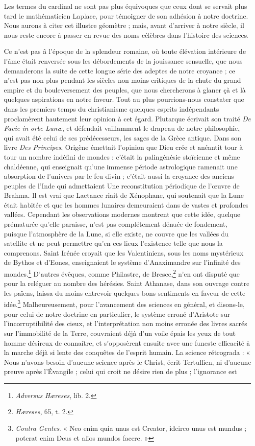 \documentclass[a4paper, 11pt, oneside]{article}
\begin{document}
Les termes du cardinal ne sont pas plus équivoques que ceux dont se servait plus tard le mathématicien Laplace, pour témoigner de son adhésion à notre doctrine. Nous aurons à citer cet illustre géomètre ; mais, avant d'arriver à notre siècle, il nous reste encore à passer en revue des noms célèbres dans l'histoire des sciences.

Ce n'est pas â l'époque de la splendeur romaine, où toute élévation intérieure de l'âme était renversée sous les débordements de la jouissance sensuelle, que nous demanderons la suite de cette longue série des adeptes de notre croyance ; ce n'est pas non plus pendant les siècles non moins critiques de la chute du grand empire et du bouleversement des peuples, que nous chercherons à glaner çà et là quelques aspirations en notre faveur. Tout au plus pourrions-nous constater que dans les premiers temps du christianisme quelques esprits indépendants proclamèrent hautement leur opinion à cet égard. Plutarque écrivait son traité \emph{De Facie in orbe Lunæ}, et défendait vaillamment le drapeau de notre philosophie, qui avait été celui de ses prédécesseurs, les sages de la Grèce antique. Dans son livre \emph{Des Principes}, Origène émettait l'opinion que Dieu crée et anéantit tour à tour un nombre indéfini de mondes : c'était la palingénésie stoïcienne et même chaldéenne, qui enseignait qu'une immense période astrologique ramenait une absorption de l'univers par le feu divin ; c'était aussi la croyance des anciens peuples de l'Inde qui admettaient Une reconstitution périodique de l'œuvre de Brahma. Il est vrai que Lactance riait de Xénophane, qui soutenait que la Lune était habitée et que les hommes lunaires demeuraient dans de vastes et profondes vallées. Cependant les observations modernes montrent que cette idée, quelque prématurée qu'elle paraisse, n'est pas complétement dénuée de fondement, puisque l'atmosphère de la Lune, si elle existe, ne couvre que les vallées du satellite et ne peut permettre qu'en ces lieux l'existence telle que nous la comprenons. Saint Irénée croyait que les Valentiniens, sous les noms mystérieux de Bythos et d'Eones, enseignaient le système d'Anaximandre sur l'infinité des mondes.\footnote{\emph{Adversus Hæreses}, lib. 2.} D'autres évêques, comme Philastre, de Bresce,\footnote{\emph{Hæreses}, 65, t. 2.} n'en ont disputé que pour la reléguer au nombre des hérésies. Saint Athanase, dans son ouvrage contre les païens, laissa du moins entrevoir quelques bons sentiments en faveur de cette idée.\footnote{\emph{Contra Gentes}. « Neo enim quia unus est Creator, idcirco unus est mundus ; poterat enim Deus et alios mundos facere. »} Malheureusement, pour l'avancement des sciences en général, et disons-le, pour celui de notre doctrine en particulier, le système erroné d'Aristote sur l'incorruptibilité des cieux, et l'interprétation non moins erronée des livres sacrés sur l'immobilité de la Terre, couvraient déjà d'un voile épais les yeux de tout homme désireux de connaître, et s'opposèrent ensuite avec une funeste efficacité à la marche déjà si lente des conquêtes de l'esprit humain. La science rétrograda : « Nous n'avons besoin d'aucune science après le Christ, écrit Tertullien, ni d'aucune preuve après l'Évangile ; celui qui croit ne désire rien de plus ; l'ignorance est 
\end{document}
